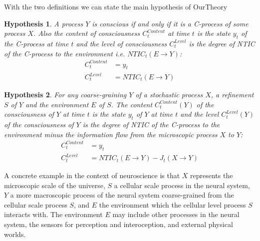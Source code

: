 \documentclass[utf8]{article}
\newtheorem*{hypothesis}{Hypothesis}
\begin{document}
        With the two definitions we can state the main hypothesis of \ac{OurTheory}
        \begin{hypothesis}
        A process $Y$ is conscious if and only if it is a C-process of some process $X$. Also the content of consciousness $C_t^{Content}$ at time $t$ is the state $y_t$ of the C-process at time $t$ and the level of consciousness $C_t^{Level}$ is the degree of NTIC of the C-process to the environment i.e. $NTIC_t(E\rightarrow Y)$:
        \begin{align}
            C_t^{Content} &= y_t \label{eq:cContent}\\
            C_t^{Level} &= NTIC_t(E\rightarrow Y) \label{eq:cLevel}
        \end{align}
        \end{hypothesis}

\begin{hypothesis}
        For any coarse-graining $Y$ of a stochastic process $X$, a refinement $S$ of $Y$ and the environment $E$ of $S$.  
        The \emph{content $C_t^{Content}(Y)$ of the consciousness of $Y$ at time $t$} is the state $y_t$ of $Y$ at time $t$ and \emph{the level $C_t^{Level}(Y)$ of the consciousness of $Y$} is the degree of NTIC of the C-process to the environment minus the information flow from the microscopic process $X$ to $Y$:
        \begin{align}
            C_t^{Content} &= y_t \label{eq:cContent}\\
            C_t^{Level} &= NTIC_t(E\rightarrow Y)-J_t(X \rightarrow Y) \label{eq:cLevel}
        \end{align}
        \end{hypothesis}

        

        A concrete example in the context of neuroscience is that $X$ represents the microscopic scale of the universe, $S$ a cellular scale process in the neural system, $Y$ a more macroscopic process of the neural system coarse-grained from the cellular scale process $S$, and $E$ the environment which the cellular level process $S$ interacts with.  The environment $E$ may include other processes in the neural system, the sensors for perception and interoception, and external physical worlds.\\
        
\end{document}
